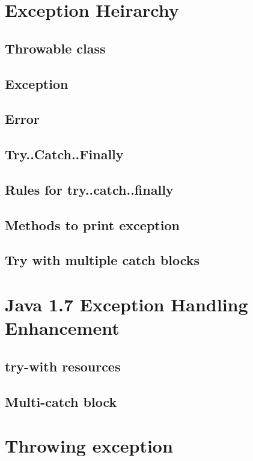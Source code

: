 \documentclass[14pt,fleqn]{extbook} %
\begin{document}
\section{Exception Heirarchy}

\subsection{Throwable class}

\subsection{Exception}

\subsection{Error}

\subsection{Try..Catch..Finally}

\subsection{Rules for try..catch..finally}

\subsection{Methods to print exception}

\subsection{Try with multiple catch blocks}

\section{Java 1.7 Exception Handling Enhancement}

\subsection{try-with resources}

\subsection{Multi-catch block}

\section{Throwing exception}

\end{document}

